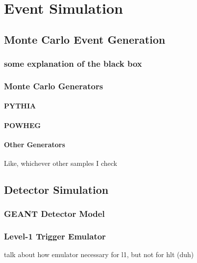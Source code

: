 \chapter{Event Simulation}

\section{Monte Carlo Event Generation}
\subsection{some explanation of the black box}
\subsection{Monte Carlo Generators}
\subsubsection{PYTHIA}
\subsubsection{POWHEG}
\subsubsection{Other Generators}
Like, whichever other samples I check

\section{Detector Simulation}
\subsection{GEANT Detector Model}

\subsection{Level-1 Trigger Emulator}
talk about how emulator necessary for l1, but not for hlt (duh)
